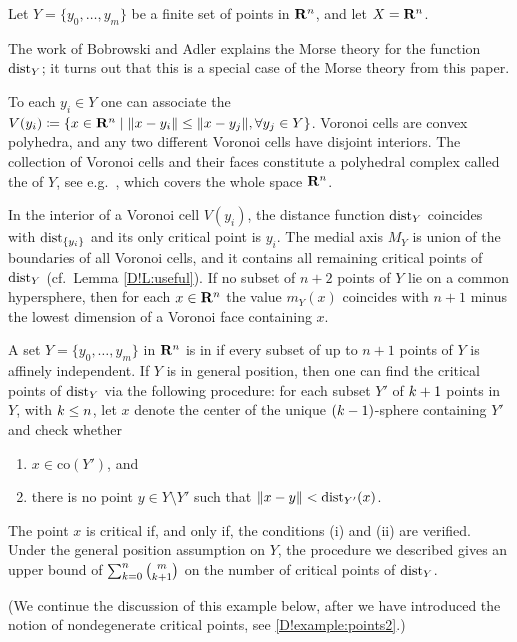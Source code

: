 \begin{example}
\label{D!ex:finiteY}
  Let $Y=\{y_0,\ldots ,y_m \}$ be a finite set of points in $\mathbf{R}^n$, and let $X=\mathbf{R}^n$.

  The work of Bobrowski and
  Adler \cite{bobrowski2014distance} explains the Morse theory for the function  $\operatorname{dist}_Y$; it turns out that this is a special case of the Morse theory from this paper. 

  To each $y_i\in Y$ one can associate the  $V(y_i) \coloneq \{ x \in \mathbf{R}^n \mid \| x-y_i \| \leq \| x-y_j \|, \forall y_j \in Y \}$. Voronoi cells are convex polyhedra, and any two different Voronoi cells have disjoint interiors. The collection of Voronoi cells and their faces constitute a polyhedral complex \cite{ziegler2012lectures} called the  of $Y$, see e.g.\ 
  \cite{boissonnat2018geometric}, which covers the whole space $\mathbf{R}^n$.

  In the interior of a Voronoi cell $V(y_i)$, the distance function $\operatorname{dist}_Y$  coincides with $\operatorname{dist}_{\{y_i\}}$ and its only critical point is $y_i$. The medial axis $M_Y$ is union of the boundaries of all Voronoi cells, and it contains all remaining critical points of $\operatorname{dist}_Y$ (cf.\ Lemma \ref{D!L:useful}). 
  If no subset of $n+2$ points of $Y$ lie on a common hypersphere, then for each $x\in \mathbf{R}^n$ the value $m_Y(x)$ coincides with $n+1$ minus the lowest dimension of a Voronoi face containing $x$.

  A set $Y=\{y_0,\ldots ,y_m \}$ in $\mathbf{R}^n$ is in  if every subset of up to $n+1$ points of $Y$ is affinely independent.
  If $Y$ is in general position, then one can find the critical points of $\operatorname{dist}_Y$ via the following procedure: for each subset $Y'$ of $k+1$ points in $Y$, with $k \le n$, let $x$ denote the center of the unique $(k-1)$-sphere containing $Y'$ and check whether
  \begin{enumerate}[label=(\roman*), align=left]
    \item $x \in \mathrm{co} (Y')$, and
    \item there is no point $y\in Y\setminus Y'$ such that $\| x-y\| < \operatorname{dist}_{Y'} (x)$.
  \end{enumerate}
  The point $x$ is critical if, and only if, the conditions (i) and (ii) are verified. Under the general position assumption on $Y$, the procedure we described gives an upper bound of $\sum_{k = 0}^{n} \binom{m}{k + 1}$ on the number of critical points of $\operatorname{dist}_Y$.

  (We continue the discussion of this example below, after we have introduced the notion of nondegenerate critical points, see \cref{D!example:points2}.)
\end{example}

